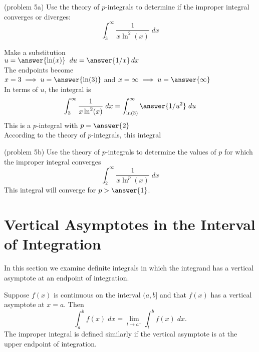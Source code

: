 \documentclass{ximera}
\begin{document}
\begin{problem}(problem 5a)
Use the theory of $p$-integrals to determine if the improper integral converges or diverges:
\[
\int_3^\infty \frac{1}{x\ln^2(x)} \; dx
\]

Make a substitution\\
$u = \answer{\ln(x)} \;\; du = \answer{1/x} \, dx$\\
The endpoints become\\
$x = 3 \implies u = \answer{\ln(3)}$ and $x= \infty \implies u = \answer{\infty}$\\
In terms of $u$, the integral is
\[
\int_3^\infty \frac{1}{x\ln^2(x)} \; dx = \int_{\ln(3)}^\infty \answer{1/u^2} \; du
\]
This is a $p$-integral with $p = \answer{2}$\\
According to the theory of $p$-integrals, this integral
\begin{multipleChoice}
\end{multipleChoice}
\end{problem}


\begin{problem}(problem 5b)
Use the theory of $p$-integrals to determine the values of $p$ for which the improper integral converges
\[
\int_2^\infty \frac{1}{x \ln^p(x)} \; dx
\]
This integral will converge for $p > \answer{1}$.
\end{problem}



\section{Vertical Asymptotes in the Interval of Integration}

In this section we examine definite integrals in which the integrand has a vertical asymptote at an endpoint of integration.

\begin{definition}
Suppose $f(x)$ is continuous on the interval $(a, b]$ and that $f(x)$ has a vertical asymptote at $x = a$.
Then
\[
\int_a^b f(x) \; dx = \lim_{t \to a^+} \int_t^b f(x) \; dx.
\]
The improper integral is defined similarly if the vertical asymptote is at the upper endpoint of integration.
\end{definition}
\end{document}
